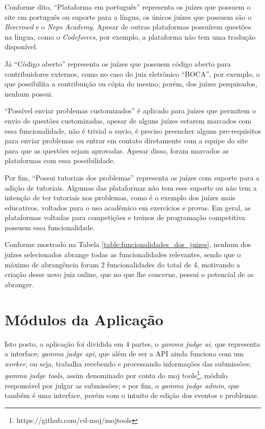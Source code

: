 Conforme dito, ``Plataforma em português'' representa os juízes que possuem o site em português ou suporte para a língua, os únicos juízes que possuem são o \textit{Beecrowd} e o \textit{Neps Academy}. Apesar de outras plataformas possuírem questões na língua, como o \textit{Codeforces}, por exemplo, a plataforma não tem uma tradução disponível.  

Já ``Código aberto'' representa os juízes que possuem código aberto para contribuidores externos, como no caso do juiz eletrônico “BOCA”, por exemplo, o que possibilita a contribuição ou cópia do mesmo; porém, dos juízes pesquisados, nenhum possui. 

``Possível enviar problemas customizados'' é aplicado para juízes que permitem o envio de questões customizadas, apesar de alguns juízes estarem marcados com essa funcionalidade, não é trivial o envio, é preciso preencher alguns pre-requisitos para enviar problemas ou entrar em contato diretamente com a equipe do site para que as questões sejam aprovadas. Apesar disso, foram marcados as plataformas com essa possibilidade. 

Por fim, ``Possui tutoriais dos problemas'' representa os juízes com suporte para a adição de tutoriais. Algumas das plataformas não tem esse suporte ou não tem a intenção de ter tutoriais nos problemas, como é o exemplo dos juízes mais educativos, voltados para o uso acadêmico em exercícios e provas. Em geral, as plataformas voltadas para competições e treinos de programação competitiva possuem essa funcionalidade.
 
Conforme mostrado na Tabela \ref{table:funcionalidades_dos_juizes}, nenhum dos juízes selecionados abrange todas as funcionalidades relevantes, sendo que o máximo de abrangência foram 2 funcionalidades do total de 4, motivando a criação desse novo juiz online, que no que lhe concerne, possui o potencial de as abranger.
 
\section{Módulos da Aplicação}
\label{sec:modulosDaAplicacao}

Isto posto, a aplicação foi dividida em 4 partes, o \textit{gamma judge ui}, que representa a interface; \textit{gamma judge api}, que além de ser a API ainda funciona com um \textit{worker}, ou seja, trabalha recebendo e processando informações das submissões;  \textit{gamma judge tools}, assim denominado por conta do moj tools\footnote{https://github.com/cd-moj/mojtools}, módulo responsável por julgar as submissões; e por fim, o \textit{gamma judge admin}, que também é uma interface, porém com o intuito de edição dos eventos e problemas.

